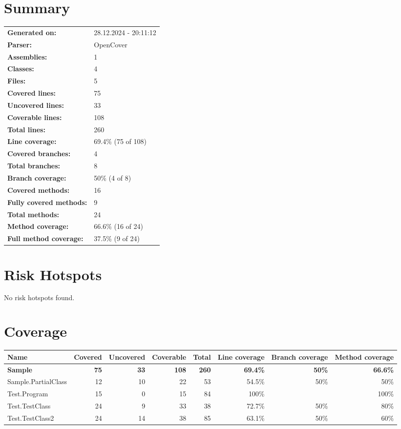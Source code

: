 \documentclass[a4paper,landscape,10pt]{article}
\begin{document}
\setcounter{secnumdepth}{-1}
\section{Summary}
\begin{longtable}[l]{ll}
\textbf{Generated on:} & 28.12.2024 - 20:11:12\\
\textbf{Parser:} & OpenCover\\
\textbf{Assemblies:} & 1\\
\textbf{Classes:} & 4\\
\textbf{Files:} & 5\\
\textbf{Covered lines:} & 75\\
\textbf{Uncovered lines:} & 33\\
\textbf{Coverable lines:} & 108\\
\textbf{Total lines:} & 260\\
\textbf{Line coverage:} & 69.4\% (75 of 108)\\
\textbf{Covered branches:} & 4\\
\textbf{Total branches:} & 8\\
\textbf{Branch coverage:} & 50\% (4 of 8)\\
\textbf{Covered methods:} & 16\\
\textbf{Fully covered methods:} & 9\\
\textbf{Total methods:} & 24\\
\textbf{Method coverage:} & 66.6\% (16 of 24)\\
\textbf{Full method coverage:} & 37.5\% (9 of 24)\\
\end{longtable}
\section{Risk Hotspots}
No risk hotspots found.
\section{Coverage}
\begin{longtable}[l]{|l|r|r|r|r|r|r|r|}
\hline
\textbf{Name} & \textbf{Covered} & \textbf{Uncovered} & \textbf{Coverable} & \textbf{Total} & \textbf{Line coverage} & \textbf{Branch coverage} & \textbf{Method coverage}\\
\hline
\textbf{Sample} & \textbf{75} & \textbf{33} & \textbf{108} & \textbf{260} & \textbf{69.4\%} & \textbf{50\%} & \textbf{66.6\%}\\
\hline
Sample.PartialClass & 12 & 10 & 22 & 53 & 54.5\% & 50\% & 50\%\\
\hline
Test.Program & 15 & 0 & 15 & 84 & 100\% &  & 100\%\\
\hline
Test.TestClass & 24 & 9 & 33 & 38 & 72.7\% & 50\% & 80\%\\
\hline
Test.TestClass2 & 24 & 14 & 38 & 85 & 63.1\% & 50\% & 60\%\\
\hline
\end{longtable}
\end{document}

